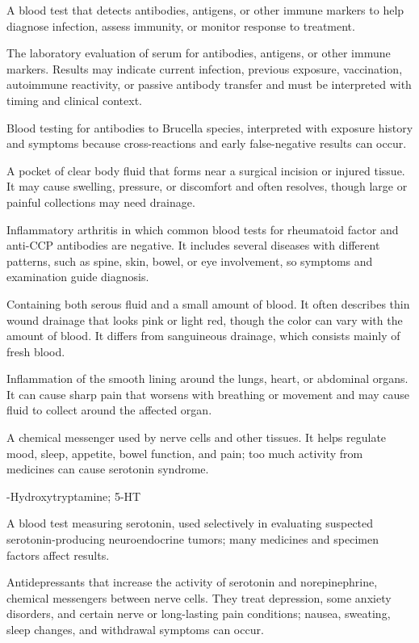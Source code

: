  A blood test that detects antibodies, antigens, or other immune markers to help diagnose infection, assess immunity, or monitor response to treatment.

 The laboratory evaluation of serum for antibodies, antigens, or other immune markers.
Results may indicate current infection, previous exposure, vaccination, autoimmune
reactivity, or passive antibody transfer and must be interpreted with timing and
clinical context.

 Blood testing for antibodies to Brucella species, interpreted with exposure history and symptoms because cross-reactions and early false-negative results can occur.

 A pocket of clear body fluid that forms near a surgical incision or injured tissue. It may cause swelling, pressure, or discomfort and often resolves, though large or painful collections may need drainage.

 Inflammatory arthritis in which common blood tests for rheumatoid factor and anti-CCP antibodies are negative. It includes several diseases with different patterns, such as spine, skin, bowel, or eye involvement, so symptoms and examination guide diagnosis.

 Containing both serous fluid and a small amount of blood. It often describes thin wound drainage that looks pink or light red, though the color can vary with the amount of blood. It differs from sanguineous drainage, which consists mainly of fresh blood.

 Inflammation of the smooth lining around the lungs, heart, or abdominal organs. It can cause sharp pain that worsens with breathing or movement and may cause fluid to collect around the affected organ.

 A chemical messenger used by nerve cells and other tissues. It helps regulate mood, sleep, appetite, bowel function, and pain; too much activity from medicines can cause serotonin syndrome.

-Hydroxytryptamine; 5-HT

 A blood test measuring serotonin, used selectively in evaluating suspected serotonin-producing neuroendocrine tumors; many medicines and specimen factors affect results.

 Antidepressants that increase the activity of serotonin and norepinephrine, chemical messengers between nerve cells. They treat depression, some anxiety disorders, and certain nerve or long-lasting pain conditions; nausea, sweating, sleep changes, and withdrawal symptoms can occur.

